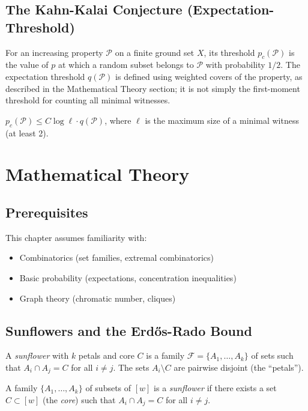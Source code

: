 \subsection{The Kahn-Kalai Conjecture (Expectation-Threshold)}
For an increasing property $\mathcal{P}$ on a finite ground set $X$, its threshold $p_c(\mathcal{P})$ is the value of $p$ at which a random subset belongs to $\mathcal{P}$ with probability $1/2$. The expectation threshold $q(\mathcal{P})$ is defined using weighted covers of the property, as described in the Mathematical Theory section; it is not simply the first-moment threshold for counting all minimal witnesses.

\begin{conjecture}
$p_c(\mathcal{P}) \le C \log \ell \cdot q(\mathcal{P})$, where $\ell$ is the maximum size of a minimal witness (at least 2).
\end{conjecture}

\section{Mathematical Theory}

\subsection{Prerequisites}
This chapter assumes familiarity with:
\begin{itemize}
\item Combinatorics (set families, extremal combinatorics)
\item Basic probability (expectations, concentration inequalities)
\item Graph theory (chromatic number, cliques)
\end{itemize}

\subsection{Sunflowers and the Erd\H{o}s-Rado Bound}

A \emph{sunflower} with $k$ petals and core $C$ is a family $\mathcal{F} = \{A_1, \ldots, A_k\}$ of sets such that $A_i \cap A_j = C$ for all $i \neq j$. The sets $A_i \setminus C$ are pairwise disjoint (the ``petals'').

\begin{definition}[Sunflower]
A family $\{A_1, \ldots, A_k\}$ of subsets of $[w]$ is a \emph{sunflower} if there exists a set $C \subset [w]$ (the \emph{core}) such that $A_i \cap A_j = C$ for all $i \neq j$.
\end{definition}

